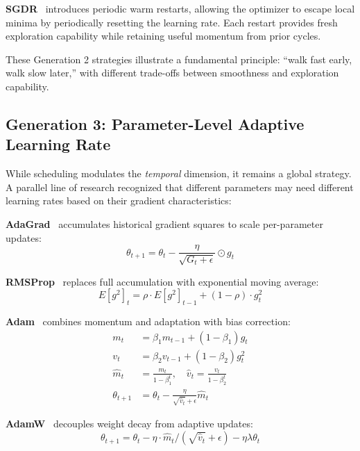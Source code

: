 \documentclass[a4paper,fleqn]{cas-dc}
\begin{document}
\textbf{SGDR}~\citet{loshchilov2017sgdr} introduces periodic warm restarts, allowing the optimizer to escape local minima by periodically resetting the learning rate. Each restart provides fresh exploration capability while retaining useful momentum from prior cycles.

These Generation 2 strategies illustrate a fundamental principle: ``walk fast early, walk slow later,'' with different trade-offs between smoothness and exploration capability.

\subsection{Generation 3: Parameter-Level Adaptive Learning Rate}

While scheduling modulates the \emph{temporal} dimension, it remains a global strategy. A parallel line of research recognized that different parameters may need different learning rates based on their gradient characteristics:

\textbf{AdaGrad}~\citet{duchi2011adagrad} accumulates historical gradient squares to scale per-parameter updates:
\begin{equation}\label{eq:adagrad}
\theta_{t+1} = \theta_t - \frac{\eta}{\sqrt{G_t + \epsilon}} \odot g_t
\end{equation}

\textbf{RMSProp}~\citet{tieleman2012rmsprop} replaces full accumulation with exponential moving average:
\begin{equation}\label{eq:rmsprop}
E[g^2]_t = \rho \cdot E[g^2]_{t-1} + (1-\rho) \cdot g_t^2
\end{equation}

\textbf{Adam}~\citet{kingma2015adam} combines momentum and adaptation with bias correction:
\begin{align}
m_t &= \beta_1 m_{t-1} + (1-\beta_1) g_t \nonumber\\
v_t &= \beta_2 v_{t-1} + (1-\beta_2) g_t^2 \label{eq:adam_moments}\\
\hat{m}_t &= \frac{m_t}{1-\beta_1^t}, \quad \hat{v}_t = \frac{v_t}{1-\beta_2^t} \label{eq:adam_bias}\\
\theta_{t+1} &= \theta_t - \frac{\eta}{\sqrt{\hat{v}_t} + \epsilon} \hat{m}_t \label{eq:adam_update}
\end{align}

\textbf{AdamW}~\citet{loshchilov2019decoupled} decouples weight decay from adaptive updates:
\begin{equation}\label{eq:adamw}
\theta_{t+1} = \theta_t - \eta \cdot \hat{m}_t / (\sqrt{\hat{v}_t} + \epsilon) - \eta\lambda\theta_t
\end{equation}
\end{document}

